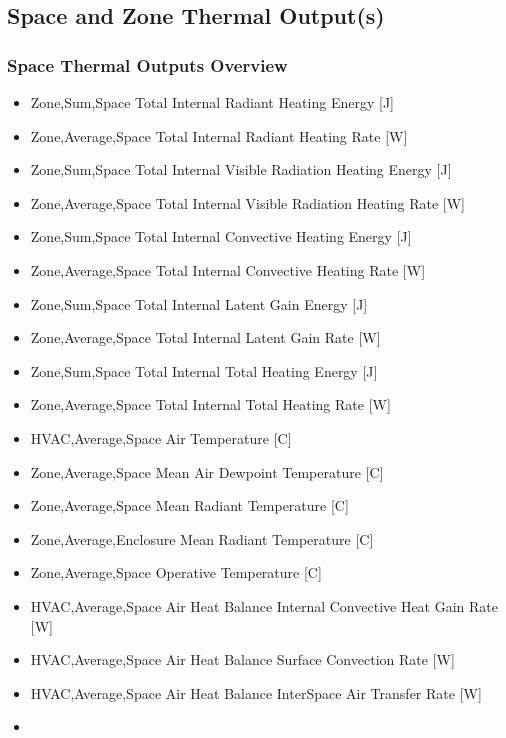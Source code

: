 \subsection{Space and Zone Thermal Output(s)}\label{Space-thermal-outputs}

\subsubsection{Space Thermal Outputs Overview}

\begin{itemize}
\item
  Zone,Sum,Space Total Internal Radiant Heating Energy {[}J{]}
\item
  Zone,Average,Space Total Internal Radiant Heating Rate {[}W{]}
\item
  Zone,Sum,Space Total Internal Visible Radiation Heating Energy {[}J{]}
\item
  Zone,Average,Space Total Internal Visible Radiation Heating Rate {[}W{]}
\item
  Zone,Sum,Space Total Internal Convective Heating Energy {[}J{]}
\item
  Zone,Average,Space Total Internal Convective Heating Rate {[}W{]}
\item
  Zone,Sum,Space Total Internal Latent Gain Energy {[}J{]}
\item
  Zone,Average,Space Total Internal Latent Gain Rate {[}W{]}
\item
  Zone,Sum,Space Total Internal Total Heating Energy {[}J{]}
\item
  Zone,Average,Space Total Internal Total Heating Rate {[}W{]}
\item
  HVAC,Average,Space Air Temperature {[}C{]}
\item
  Zone,Average,Space Mean Air Dewpoint Temperature {[}C{]}
\item
  Zone,Average,Space Mean Radiant Temperature {[}C{]}
\item
  Zone,Average,Enclosure Mean Radiant Temperature {[}C{]}
\item
  Zone,Average,Space Operative Temperature {[}C{]}
\item
  HVAC,Average,Space Air Heat Balance Internal Convective Heat Gain Rate {[}W{]}
\item
  HVAC,Average,Space Air Heat Balance Surface Convection Rate {[}W{]}
\item
  HVAC,Average,Space Air Heat Balance InterSpace Air Transfer Rate {[}W{]}
\item

\end{itemize}
